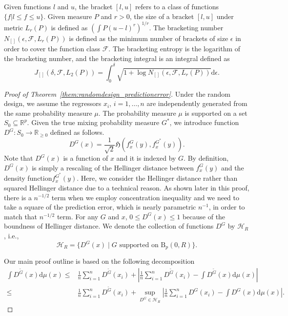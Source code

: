\documentclass[11pt]{article}
\numberwithin{equation}{section}
\newcommand{\RS}{\mathbb{R}}
\newcommand{\diff}{\mathrm{d}} %
\newcommand{\ball}{\mathrm{B}}
\begin{document}
\begin{appendices}
Given functions $l$ and $u$, the bracket $[l,u]$ refers to a class of functions $\{f| l\leq f \leq u\}$. Given measure $P$ and $r>0$, the size of a bracket $[l,u]$ under metric $L_r(P)$ is defined as $ (\int P(u-l)^r)^{1/r}$. The bracketing number $N_{[]}(\epsilon, \mathcal{F},L_r(P))$ is defined as the minimum number of brackets of size $\epsilon$ in order to cover the function class $\mathcal{F}$. The bracketing entropy is the logarithm of the bracketing number, and the bracketing integral is an integral defined as
\[
J_{[]}(\delta, \mathcal{F}, L_2(P)) = \int_{0}^\delta \sqrt{1 + \log N_{[]}(\epsilon, \mathcal{F},L_r(P))} \diff \epsilon.
\]

\begin{proof}[Proof of Theorem~\ref{them:randomdesign_predictionerror}]

Under the random design, we assume the regressors $x_i$, $i = 1,\dots, n$ are independently generated from the same probability measure $\mu$. The probability measure $\mu$ is supported on a set $S_0 \subseteq \RS^p$. 
Given the true mixing probability measure $G^*$, we introduce function $D^{G}:S_0 \rightarrow \RS_{\geq 0}$ defined as follows.
\begin{equation}
D^{G}(x) = \frac{1}{\sqrt{2}}\mathfrak{H}(f^{G}_x(y), f^{G^*}_x(y)).
\label{eq:defn_D}
\end{equation}
Note that $D^G(x)$ is a function of $x$ and it is indexed by $G$. By definition, $D^{G}(x)$ is simply a rescaling of the Hellinger distance between $f^{G}_x(y)$ and the density function$ f^{G^*}_x(y)$. Here, we consider the Hellinger distance rather than squared Hellinger distance due to a technical reason. As shown later in this proof, there is a $n^{-1/2}$ term when we employ concentration inequality and we need to take a square of the prediction error, which is nearly parametric $n^{-1}$, in order to match that $n^{-1/2}$ term.
For any $G$ and $x$, $0 \leq D^G(x)\leq 1$ because of the boundness of Hellinger distance. We denote the collection of functions $D^G$ by $\mathcal{H}_R$, i.e.,
\[
\mathcal{H}_R = \{D^{G}(x) \mid G \text{ supported on } \ball_p(0,R) \}.
\]

Our main proof outline is based on the following decomposition
\begin{equation}
\begin{split}
\int D^{\tilde{G}}(x) \mathrm{d} \mu(x) \leq & \frac{1}{n} \sum_{i=1}^nD^{\tilde{G}}(x_i) + \left| \frac{1}{n} \sum_{i=1}^n D^{\tilde{G}}(x_i) - \int D^{\tilde{G}}(x) \mathrm{d} \mu(x)\right|\\
\leq  &\frac{1}{n} \sum_{i=1}^nD^{\tilde{G}}(x_i) + \sup_{D^G \in \mathcal{H}_R} \left| \frac{1}{n} \sum_{i=1}^n D^G(x_i) - \int D^G(x) \mathrm{d} \mu(x)\right|.
\end{split}
\label{eq:random_observation}
\end{equation}


\end{proof}
\end{appendices}
\end{document}
